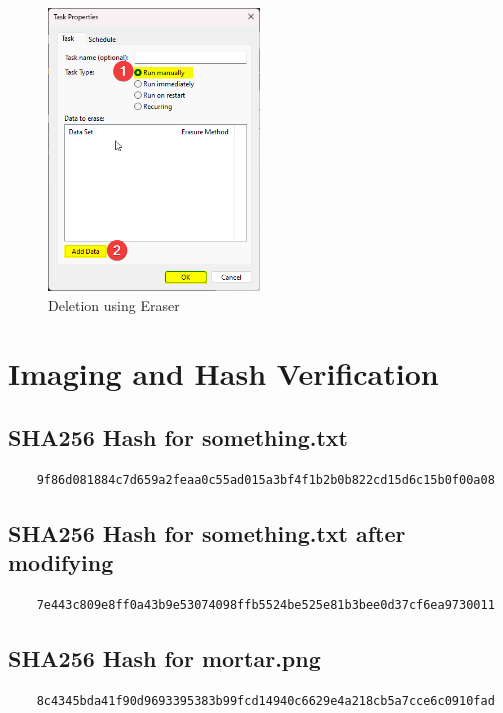 \documentclass[11pt]{article}
\begin{document}
\begin{figure}[H]
    \centering
    \includegraphics[width=0.5\textwidth]{Deletion_2.png}
    \caption{Deletion using Eraser}
    \label{fig:1}

\end{figure}

\section{Imaging and Hash Verification}
\subsection{SHA256 Hash for something.txt}
\begin{verbatim}
    9f86d081884c7d659a2feaa0c55ad015a3bf4f1b2b0b822cd15d6c15b0f00a08
\end{verbatim}

\subsection{SHA256 Hash for something.txt after modifying}
\begin{verbatim}
    7e443c809e8ff0a43b9e53074098ffb5524be525e81b3bee0d37cf6ea9730011
\end{verbatim}

\subsection{SHA256 Hash for mortar.png}
\begin{verbatim}
    8c4345bda41f90d9693395383b99fcd14940c6629e4a218cb5a7cce6c0910fad
\end{verbatim}
\end{document}
